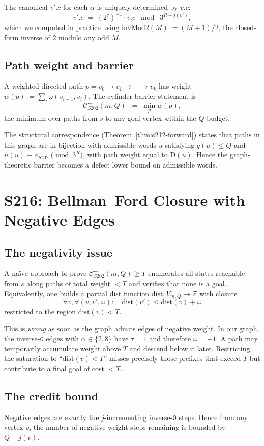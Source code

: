 \documentclass[11pt,a4paper]{article}
\theoremstyle{plain}
\theoremstyle{definition}
\theoremstyle{plain}
\newcommand{\ZZ}{\mathbb{Z}}
\newcommand{\Calphax}{\mathcal{C}^{\leftarrow}_{S202}}
\newcommand{\aS}{a_{S202}}
\newcommand{\defect}{\mathrm{D}}
\begin{document}
\medskip
\noindent The canonical $v'.c$ for each $\alpha$ is uniquely determined
by $v.c$:
\[
  v'.c
  \;=\;
  (2^\tau)^{-1} \cdot v.c
  \;\bmod\; 3^{R+j(v')},
\]
which we computed in practice using $\mathrm{invMod2}(M) := (M+1)/2$,
the closed-form inverse of $2$ modulo any odd $M$.

\subsection{Path weight and barrier}
A weighted directed path $p = v_0 \to v_1 \to \cdots \to v_k$ has
weight $w(p) := \sum_i \omega(v_{i-1}, v_i)$.
The cylinder barrier statement is
\[
  \Calphax(m, Q) \;:=\;
  \min_p w(p),
\]
the minimum over paths from $s$ to any goal vertex within the
$Q$-budget.

The structural correspondence (Theorem~\ref{thm:s212-forward}) states
that paths in this graph are in bijection with admissible words $u$
satisfying $q(u) \le Q$ and $n(u) \equiv \aS \pmod{3^R}$, with path
weight equal to $\defect(u)$. Hence the graph-theoretic barrier
becomes a defect lower bound on admissible words.

\section{S216: Bellman--Ford Closure with Negative Edges}\label{sec:closure-to-barrier}

\subsection{The negativity issue}
A naïve approach to prove $\Calphax(m, Q) \ge T$ enumerates all
states reachable from $s$ along paths of total weight $< T$ and
verifies that none is a goal. Equivalently, one builds a partial
dist function $\mathrm{dist} : V_{m,Q} \to \ZZ$ with closure
\[
  \forall v, \forall (v, v', \omega): \quad
  \mathrm{dist}(v') \le \mathrm{dist}(v) + \omega
\]
restricted to the region $\mathrm{dist}(v) < T$.

This is \emph{wrong} as soon as the graph admits edges of negative
weight. In our graph, the inverse-$\mathtt{0}$ edges with
$\alpha \in \{2, 8\}$ have $\tau = 1$ and therefore
$\omega = -1$. A path may temporarily accumulate weight above $T$ and
descend below it later. Restricting the saturation to
``$\mathrm{dist}(v) < T$'' misses precisely those prefixes that
exceed $T$ but contribute to a final goal of cost $< T$.

\subsection{The credit bound}
Negative edges are exactly the $j$-incrementing inverse-$\mathtt{0}$
steps. Hence from any vertex $v$, the number of negative-weight steps
remaining is bounded by $Q - j(v)$.
\end{document}
